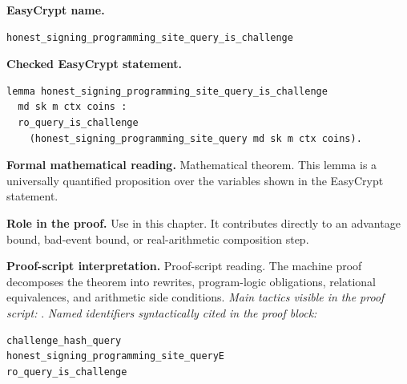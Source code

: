 \begin{formaltheorem}
\noindent\textbf{EasyCrypt name.}
\begin{lstlisting}[language=EasyCrypt,basicstyle=\ttfamily\scriptsize]
honest_signing_programming_site_query_is_challenge
\end{lstlisting}
\noindent\textbf{Checked EasyCrypt statement.}
\begin{lstlisting}[language=EasyCrypt,basicstyle=\ttfamily\scriptsize]
lemma honest_signing_programming_site_query_is_challenge
  md sk m ctx coins :
  ro_query_is_challenge
    (honest_signing_programming_site_query md sk m ctx coins).
\end{lstlisting}
\noindent\textbf{Formal mathematical reading.}
Mathematical theorem. This lemma is a universally quantified proposition over the variables shown in the EasyCrypt statement.

\noindent\textbf{Role in the proof.}
Use in this chapter. It contributes directly to an advantage bound, bad-event bound, or real-arithmetic composition step.

\noindent\textbf{Proof-script interpretation.}
Proof-script reading. The machine proof decomposes the theorem into rewrites, program-logic obligations, relational equivalences, and arithmetic side conditions.
\emph{Main tactics visible in the proof script:} .
\emph{Named identifiers syntactically cited in the proof block:}
\begin{lstlisting}[language=EasyCrypt,basicstyle=\ttfamily\scriptsize]
challenge_hash_query
honest_signing_programming_site_queryE
ro_query_is_challenge
\end{lstlisting}

\end{formaltheorem}


